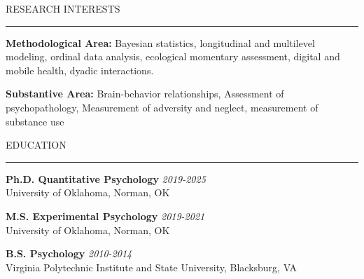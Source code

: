 \documentclass{resume} %
\renewenvironment{rSection}[1]{
\sectionskip
\textcolor{CarnegieMellonRed}{\MakeUppercase{#1}}
\sectionlineskip
\hrule
\begin{list}{}{
\setlength{\leftmargin}{1.5em}
}
\item[]
}{
\end{list}
}
\begin{document}
\begin{rSection}{Research Interests}
\textbf{Methodological Area:} Bayesian statistics, longitudinal and multilevel modeling, ordinal data analysis, ecological
momentary assessment, digital and mobile health, dyadic interactions.

\textbf{Substantive Area:} Brain-behavior relationships, Assessment of psychopathology, Measurement of adversity and neglect, measurement of substance use
\end{rSection}


\begin{rSection}{Education}
{\bf Ph.D. Quantitative Psychology} \hfill {\em 2019-2025} 
\\ University of Oklahoma, Norman, OK \hfill 

{\bf M.S. Experimental Psychology} \hfill {\em 2019-2021} 
\\ University of Oklahoma, Norman, OK \hfill

{\bf B.S. Psychology} \hfill {\em 2010-2014}
\\ Virginia Polytechnic Institute and State University, Blacksburg, VA

\end{rSection}
\end{document}
